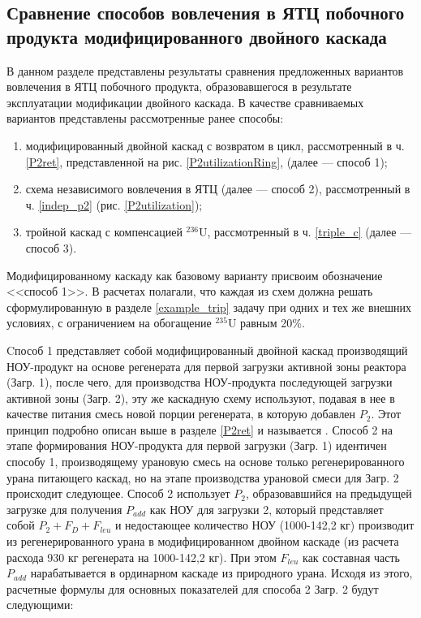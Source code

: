 \subsection{Сравнение способов вовлечения в ЯТЦ побочного продукта модифицированного двойного каскада}

В данном разделе представлены результаты сравнения предложенных вариантов вовлечения в ЯТЦ побочного продукта, образовавшегося в результате эксплуатации модификации двойного каскада. В качестве сравниваемых вариантов представлены рассмотренные ранее способы: 

\begin{enumerate}
    \item модифицированный двойной каскад с возвратом в цикл, рассмотренный в ч. \ref{P2ret}, представленной на рис. \ref{P2utilizationRing}, (далее --- способ 1);
    \item схема независимого вовлечения в ЯТЦ (далее --- способ 2), рассмотренный в ч. \ref{indep_p2} (рис. \ref{P2utilization});
    \item тройной каскад с компенсацией $^{236}$U, рассмотренный в ч. \ref{triple_c} (далее --- способ 3).
\end{enumerate}

Модифицированному каскаду как базовому варианту присвоим обозначение <<способ 1>>. В расчетах полагали, что каждая из схем должна решать сформулированную в разделе \ref{example_trip} задачу при одних и тех же внешних условиях, с ограничением на обогащение $^{235}$U равным 20\%.

Cпособ 1 представляет собой модифицированный двойной каскад производящий НОУ-продукт на основе регенерата для первой загрузки активной зоны реактора (Загр. 1), после чего, для производства НОУ-продукта последующей загрузки активной зоны (Загр. 2), эту же каскадную схему используют, подавая в нее в качестве питания смесь новой порции регенерата, в которую добавлен $P_2$. Этот принцип подробно описан выше в разделе \ref{P2ret} и называется . Способ 2 на этапе формирования НОУ-продукта для первой загрузки (Загр. 1) идентичен способу 1, производящему урановую смесь на основе только регенерированного урана питающего каскад, но на этапе производства урановой смеси для Загр. 2 происходит следующее. Способ 2 использует $P_2$, образовавшийся на предыдущей загрузке для получения $P_{add}$ как НОУ для загрузки 2, который представляет собой $P_2+F_D+F_{leu}$ и недостающее количество НОУ (1000-142,2 кг) производит из регенерированного урана в модифицированном двойном каскаде (из расчета расхода 930 кг регенерата на 1000-142,2 кг). При этом $F_{leu}$ как составная часть $P_{add}$ нарабатывается в ординарном каскаде из природного урана. Исходя из этого, расчетные формулы для основных показателей для способа 2 Загр. 2 будут следующими:

